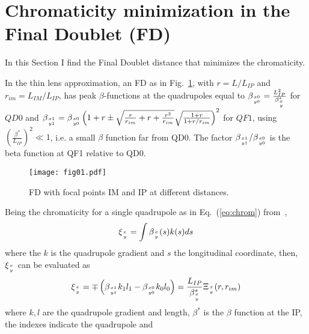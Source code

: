 \section{Chromaticity minimization in the Final Doublet (FD)}
In this Section I find the Final Doublet distance that minimizes the chromaticity.\par 
In the thin lens approximation, an FD as in Fig.~\ref{f:FDchrom}, with $r=L/L_{IP}$ and $r_{im}=L_{IM}/L_{IP}$, has peak $\beta$-functions at the quadrupoles equal to $\beta_{x0\atop y0}=\frac{L^2_{IP}}{\beta^*_{x\atop y}}$  for $QD0$ and $
\beta_{x1\atop y1}=\beta_{x0\atop y0}\left(1+r\pm\sqrt{\frac{r}{r_{im}}+r+\frac{r^2}{r_{im}}}\sqrt{\frac{1+r}{1+r/r_{im}}}\right)^2
$ for $QF1$, using $\left(\frac{\beta^*}{L_{IP}}\right)^2\ll1$, i.e. a small $\beta$ function far from QD0. The factor $\beta_{x1\atop y1}/\beta_{x0\atop y0}$ is the beta function at QF1 relative to QD0.\par
\begin{figure}[!htb]
 \centering
 \texttt{[image: fig01.pdf]}\caption{FD with focal points IM and IP at different distances.}\label{f:FDchrom}
 \end{figure}
Being the chromaticity for a single quadrupole as in Eq.~(\ref{eq:chrom}) from~\cite{GarciaMorales:1982827}, 
\begin{equation}
\xi_{x\atop y}=\int\beta_{x\atop y}(s)k(s)ds\label{eq:chrom}
\end{equation}
where the $k$ is the quadrupole gradient and $s$ the longitudinal coordinate, then, $\xi_{x\atop y}$ can be evaluated as
\begin{equation}
 \xi_{x\atop y}=\mp\left(\beta_{x1\atop y1}k_1l_1-\beta_{x0\atop y0}k_0l_0\right)=\frac{L_{IP}}{\beta^*_{x\atop y}}\Xi_{x\atop y}(r,r_{im})
\end{equation}
where $k,l$ are the quadrupole gradient and length, $\beta^*$ is the $\beta$ function at the IP, the indexes indicate the quadrupole and 
